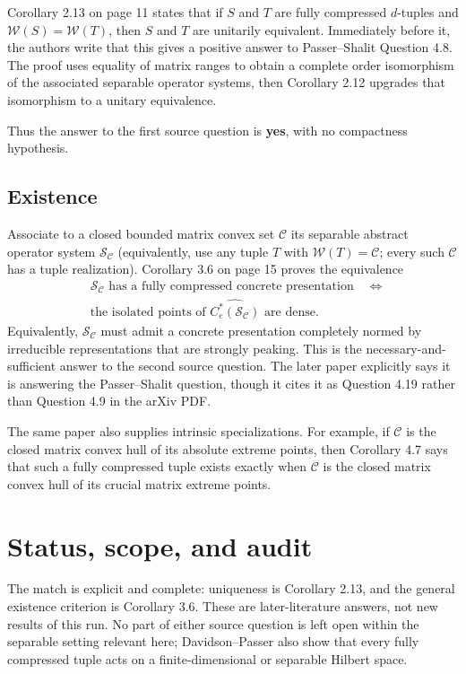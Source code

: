 \documentclass[11pt]{article}
\newcommand{\cW}{\mathcal W}
\newcommand{\cS}{\mathcal S}
\newcommand{\cC}{\mathcal C}
\begin{document}
Corollary 2.13 on page 11 states that if $S$ and $T$ are fully compressed
$d$-tuples and $\cW(S)=\cW(T)$, then $S$ and $T$ are unitarily equivalent.
Immediately before it, the authors write that this gives a positive answer to
Passer--Shalit Question 4.8.  The proof uses equality of matrix ranges to
obtain a complete order isomorphism of the associated separable operator
systems, then Corollary 2.12 upgrades that isomorphism to a unitary
equivalence.

Thus the answer to the first source question is \textbf{yes}, with no
compactness hypothesis.

\subsection*{Existence}

Associate to a closed bounded matrix convex set $\cC$ its separable abstract
operator system $\cS_{\cC}$ (equivalently, use any tuple $T$ with
$\cW(T)=\cC$; every such $\cC$ has a tuple realization).  Corollary 3.6 on
page 15 proves the equivalence
\[
\begin{split}
&\cS_{\cC}\text{ has a fully compressed concrete presentation}\quad\Longleftrightarrow\\
&\text{the isolated points of }\widehat{C_e^*(\cS_{\cC})}\text{ are dense}.
\end{split}
\]
Equivalently, $\cS_{\cC}$ must admit a concrete presentation completely normed
by irreducible representations that are strongly peaking.  This is the
necessary-and-sufficient answer to the second source question.  The later
paper explicitly says it is answering the Passer--Shalit question, though it
cites it as Question 4.19 rather than Question 4.9 in the arXiv PDF.

The same paper also supplies intrinsic specializations.  For example, if
$\cC$ is the closed matrix convex hull of its absolute extreme points, then
Corollary 4.7 says that such a fully compressed tuple exists exactly when
$\cC$ is the closed matrix convex hull of its crucial matrix extreme points.

\section{Status, scope, and audit}

The match is explicit and complete: uniqueness is Corollary 2.13, and the
general existence criterion is Corollary 3.6.  These are later-literature
answers, not new results of this run.  No part of either source question is
left open within the separable setting relevant here; Davidson--Passer also
show that every fully compressed tuple acts on a finite-dimensional or
separable Hilbert space.
\end{document}
